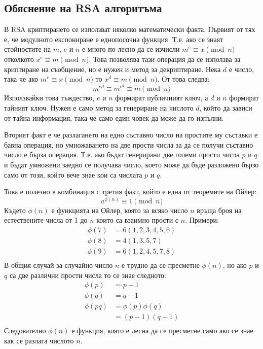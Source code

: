   \subsection{Обяснение на RSA алгоритъма}
  В RSA криптирането се използват няколко математически факта. Първият от тях е, че модулното експониране е еднопосочна функция. Т.е. ако се знаят стойностите на $m$, $e$ и $n$ е много по-лесно да се изчисли $m^e \equiv x \pmod{n}$ отколкото $x^e \equiv m \pmod{n}$. Това позволява тази операция да се използва за криптиране на съобщение, но е нужен и метод за декриптиране. Нека $d$ е число, така че ако $m^e \equiv x \pmod{n}$ то $x^d \equiv m \pmod{n}$. От това следва:
  \begin{equation}
    m^{ed} \equiv m^{e^d} \equiv m \pmod{n}
    \label{rsa-key-cancelation}
  \end{equation}
  Използвайки това тъждество, $e$ и $n$ формират публичният ключ, а $d$ и $n$ формират тайният ключ. Нужен е само метод за генериране на числото $d$, който да зависи от тайна информация, така че само един човек да може да го изпълни.

  Вторият факт е че разлагането на едно съставно число на простите му съставки е бавна операция, но умножаването на две прости числа за да се получи съставно число е бърза операция. Т.е. ако бъдат генерирани две големи прости числа $p$ и $q$ и бъдат умножени заедно се получава число, което може да бъде разложено бързо само от този, който вече знае кои са числата $p$ и $q$.

  Това е полезно в комбинация с третия факт, който е една от теоремите на Ойлер:
  \begin{equation}
    a^{\phi(n)} \equiv 1 \pmod{n}
    \label{rsa-euler-theorem}
  \end{equation}
  Където $\phi(n)$ е функцията на Ойлер, която за всяко число $n$ връща броя на естествените числа от 1 до $n$ които са взаимно прости с $n$. Примери:
  \begin{equation}
    \begin{split}
      \phi(7) &= 6 (1,2,3,4,5,6) \\
      \phi(8) &= 4 (1,3,5,7) \\
      \phi(9) &= 6 (1,2,4,5,7,8) \\
    \end{split}
    \label{rsa-euler-function}
  \end{equation}
  В общия случай за случайно число $n$ е трудно да се пресметне $\phi(n)$, но ако $p$ и $q$ са две различни прости числа то се знае следното:
  \begin{equation}
    \begin{split}
      \phi(p) &= p-1 \\
      \phi(q) &= q-1 \\
      \phi(pq) &= \phi(p)\phi(q) \\
      &= (p-1)(q-1) \\
    \end{split}
    \label{rsa-phi-calculation}
  \end{equation}
  Следователно $\phi(n)$ е функция, която е лесна да се пресметне само ако се знае как се разлага числото $n$.

